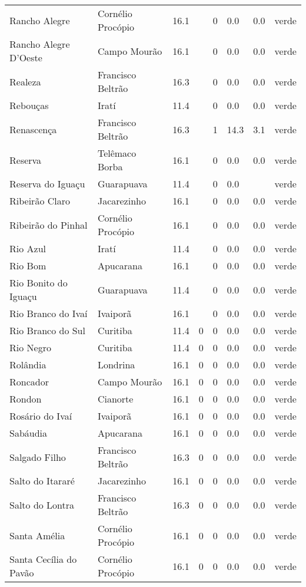 \begin{longtable}{l|lllllll}
  Rancho Alegre & Cornélio Procópio & 16.1 &  & 0 & 0.0 & 0.0 & verde \\ 
  Rancho Alegre D'Oeste & Campo Mourão & 16.1 &  & 0 & 0.0 & 0.0 & verde \\ 
  Realeza & Francisco Beltrão & 16.3 &  & 0 & 0.0 & 0.0 & verde \\ 
  Rebouças & Iratí & 11.4 &  & 0 & 0.0 & 0.0 & verde \\ 
  Renascença & Francisco Beltrão & 16.3 &  & 1 & 14.3 & 3.1 & verde \\ 
  Reserva & Telêmaco Borba & 16.1 &  & 0 & 0.0 & 0.0 & verde \\ 
  Reserva do Iguaçu & Guarapuava & 11.4 &  & 0 & 0.0 &  & verde \\ 
  Ribeirão Claro & Jacarezinho & 16.1 &  & 0 & 0.0 & 0.0 & verde \\ 
  Ribeirão do Pinhal & Cornélio Procópio & 16.1 &  & 0 & 0.0 & 0.0 & verde \\ 
  Rio Azul & Iratí & 11.4 &  & 0 & 0.0 & 0.0 & verde \\ 
  Rio Bom & Apucarana & 16.1 &  & 0 & 0.0 & 0.0 & verde \\ 
  Rio Bonito do Iguaçu & Guarapuava & 11.4 &  & 0 & 0.0 & 0.0 & verde \\ 
  Rio Branco do Ivaí & Ivaiporã & 16.1 &  & 0 & 0.0 & 0.0 & verde \\ 
  Rio Branco do Sul & Curitiba & 11.4 & 0 & 0 & 0.0 & 0.0 & verde \\ 
  Rio Negro & Curitiba & 11.4 & 0 & 0 & 0.0 & 0.0 & verde \\ 
  Rolândia & Londrina & 16.1 & 0 & 0 & 0.0 & 0.0 & verde \\ 
  Roncador & Campo Mourão & 16.1 & 0 & 0 & 0.0 & 0.0 & verde \\ 
  Rondon & Cianorte & 16.1 & 0 & 0 & 0.0 & 0.0 & verde \\ 
  Rosário do Ivaí & Ivaiporã & 16.1 & 0 & 0 & 0.0 & 0.0 & verde \\ 
  Sabáudia & Apucarana & 16.1 & 0 & 0 & 0.0 & 0.0 & verde \\ 
  Salgado Filho & Francisco Beltrão & 16.3 & 0 & 0 & 0.0 & 0.0 & verde \\ 
  Salto do Itararé & Jacarezinho & 16.1 & 0 & 0 & 0.0 & 0.0 & verde \\ 
  Salto do Lontra & Francisco Beltrão & 16.3 & 0 & 0 & 0.0 & 0.0 & verde \\ 
  Santa Amélia & Cornélio Procópio & 16.1 & 0 & 0 & 0.0 & 0.0 & verde \\ 
  Santa Cecília do Pavão & Cornélio Procópio & 16.1 & 0 & 0 & 0.0 & 0.0 & verde \\ 

\end{longtable}
